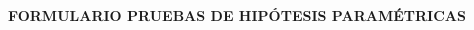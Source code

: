 \documentclass[base=hide,9pt]{elegantbook}
\begin{document}
\newpage	
\begin{center}
\textcolor{col4}{\bf \large  FORMULARIO PRUEBAS DE HIPÓTESIS PARAMÉTRICAS}
\end{center}
\vspace{.5cm}
\begin{multicols}{2}
\noindent


\end{multicols}
\end{document}

